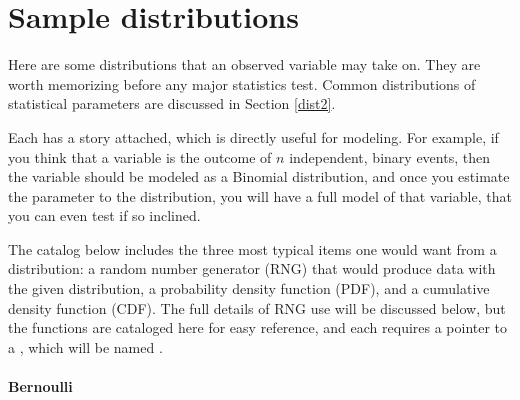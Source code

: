 
\section{Sample distributions}
\label{distlist}


Here are some distributions that an observed variable may take on. They are
worth memorizing before any major statistics test. Common distributions
of statistical parameters are discussed in Section \ref{dist2}.

Each has a story attached, which is directly useful for
modeling. For example, if you think that a variable is the outcome of $n$
independent, binary events, then the variable should be modeled as a
Binomial distribution, and once you estimate the parameter to the
distribution, you will have a full model of that variable, that you can
even test if so inclined.

The catalog below includes the three most typical items one would want
from a distribution: a random number generator (RNG) that would produce
data with the given distribution, a probability density function (PDF),
and a cumulative density function (CDF). The full details of RNG use
will be discussed below, but the functions are cataloged here for easy
reference, and each requires a pointer to a , which will be
named .


\paragraph{Bernoulli}\label{bernie}

